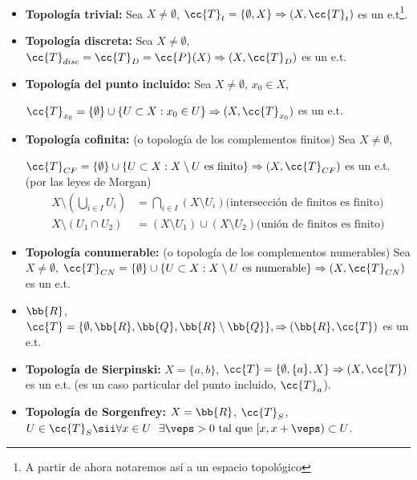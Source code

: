 \begin{ejemplo}\ 
    \begin{itemize}
        \item \textbf{Topología trivial:} Sea $X \neq \emptyset$, $\cc{T}_t = \{\emptyset, X\} \Rightarrow (X, \cc{T}_t)$ es un e.t\footnote{A partir de ahora notaremos así a un espacio topológico}.
        \item \textbf{Topología discreta:} Sea $X \neq \emptyset$, $\cc{T}_{disc}= \cc{T}_{D} = \cc{P}(X) \Rightarrow (X, \cc{T}_D)$ es un e.t.
        \item \textbf{Topología del punto incluido:} Sea $X \neq \emptyset$, $x_0\in X$,
        
        $\cc{T}_{x_0} = \{\emptyset\}\cup \{U \subset X : x_0 \in U\} \Rightarrow (X, \cc{T}_{x_0})$ es un e.t.
        \item \textbf{Topología cofinita:} (o topología de los complementos finitos) Sea $X \neq \emptyset$,
        
        $\cc{T}_{CF} = \{\emptyset\}\cup\{U\subset X : X \setminus U \text{ es finito}\} \Rightarrow (X, \cc{T}_{CF})$ es un e.t. (por las leyes de Morgan)
        \begin{align*}
            X \setminus \left(\bigcup\limits_{i\in I}U_i\right) &= \bigcap\limits_{i\in I}(X \setminus U_i) \text{(intersección de finitos es finito)}\\
            X \setminus (U_1 \cap U_2) &= (X\setminus U_1) \cup (X \setminus U_2)\text{(unión de finitos es finito)}
        \end{align*}
        \item \textbf{Topología conumerable:} (o topología de los complementos numerables) Sea $X \neq \emptyset$, $\cc{T}_{CN} = \{\emptyset\}\cup\{U\subset X : X \setminus U \text{ es numerable}\} \Rightarrow (X, \cc{T}_{CN})$ es un e.t.
        \item $\bb{R}$, $ \cc{T}=\{\emptyset, \bb{R}, \bb{Q}, \bb{R}\setminus \bb{Q}\}, \Rightarrow (\bb{R}, \cc{T})$ es un e.t. 
        \item \textbf{Topología de Sierpinski:} $X=\{a,b\}$, $\cc{T}=\{\emptyset, \{a\}, X\} \Rightarrow (X, \cc{T})$ es un e.t. (es un caso particular del punto incluido, $\cc{T}_a$).
        \item \textbf{Topología de Sorgenfrey:} $X=\bb{R}$, $\cc{T}_S$, $U\in \cc{T}_S \sii \forall x \in U \ \  \exists \veps > 0 \text{ tal que } [x, x+\veps) \subset U$. 
    \end{itemize}
    \endsquare
\end{ejemplo}

